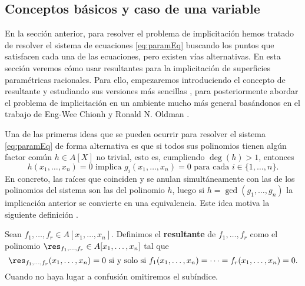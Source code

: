 \subsection{Conceptos básicos y caso de una variable}
En la sección anterior, para resolver el problema de implicitación hemos tratado de resolver el sistema de ecuaciones \eqref{eq:paramEq} buscando los puntos que satisfacen cada una de las ecuaciones, pero existen vías alternativas. En esta sección veremos cómo usar resultantes para la implicitación de superficies paramétricas racionales. Para ello, empezaremos introduciendo el concepto de resultante y estudiando sus versiones más sencillas \cite{ideals_varieties}, para posteriormente abordar el problema de implicitación en un ambiente mucho más general basándonos en el trabajo de Eng-Wee Chionh y Ronald N. Oldman \cite{res1}.\newline

Una de las primeras ideas que se pueden ocurrir para resolver el sistema \eqref{eq:paramEq} de forma alternativa es que si todos sus polinomios tienen algún factor común $h\in A[X]$ no trivial, esto es, cumpliendo $\deg(h)>1$, entonces
$$h(x_1,\dots, x_n) = 0 \text{ implica } g_i(x_1,\dots, x_n)=0 \text{ para cada } i\in\{1,\dots, n\}.$$
En concreto, las raíces que coinciden y se anulan simultáneamente con las de los polinomios del sistema son las del polinomio $h$, luego si $h = \gcd(g_1,\dots, g_n)$ la implicación anterior se convierte en una equivalencia. Este idea motiva la siguiente definición \cite{res3}.
\begin{definicion}\label{def:resultant}
    Sean $f_1,\dots , f_r \in A[x_1,\dots, x_n]$. Definimos el \textbf{resultante} de $f_1,\dots, f_r$ como el polinomio $\res_{f_1,\dots, f_r} \in A[x_1,\dots, x_n]$ tal que
    \begin{equation*}
        \res_{f_1,\dots, f_r}(x_1,\dots, x_n) = 0 \text{ si y solo si } f_1(x_1,\dots, x_n) = \cdots =  f_r(x_1,\dots, x_n) = 0.
    \end{equation*}
    Cuando no haya lugar a confusión omitiremos el subíndice.
\end{definicion}

